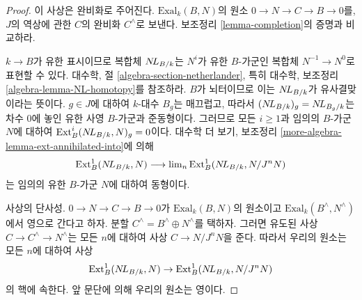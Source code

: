 \begin{proof}
이 사상은 완비화로 주어진다. $\text{Exal}_k(B, N)$의 원소
$0 \to N \to C \to B \to 0$를, $J$의 역상에 관한 $C$의 완비화
$C^\wedge$로 보낸다. 보조정리 \ref{lemma-completion}의 증명과 비교하라.

\medskip\noindent
$k \to B$가 유한 표시이므로 복합체 $\mathop{N\!L}\nolimits_{B/k}$는 $N^i$가 유한
$B$-가군인 복합체 $N^{-1} \to N^0$로 표현할 수 있다. 대수학, 절
\ref{algebra-section-netherlander}, 특히 대수학, 보조정리
\ref{algebra-lemma-NL-homotopy}를 참조하라. $B$가 뇌터이므로 이는
$\mathop{N\!L}\nolimits_{B/k}$가 유사결맞이라는 뜻이다. $g \in J$에 대하여 $k$-대수
$B_g$는 매끄럽고, 따라서 $(\mathop{N\!L}\nolimits_{B/k})_g = \mathop{N\!L}\nolimits_{B_g/k}$는 차수 $0$에
놓인 유한 사영 $B$-가군과 준동형이다.%
그러므로 모든 $i \geq 1$과 임의의 $B$-가군 $N$에 대하여
$\text{Ext}^i_B(\mathop{N\!L}\nolimits_{B/k}, N)_g = 0$이다. 대수학 더 보기, 보조정리
\ref{more-algebra-lemma-ext-annihilated-into}에 의해
$$
\text{Ext}^1_B(\mathop{N\!L}\nolimits_{B/k}, N) \longrightarrow
\mathop{\mathrm{lim}}\nolimits_n \text{Ext}^1_B(\mathop{N\!L}\nolimits_{B/k}, N/J^n N)
$$
는 임의의 유한 $B$-가군 $N$에 대하여 동형이다.

\medskip\noindent
사상의 단사성. $0 \to N \to C \to B \to 0$가
$\text{Exal}_k(B, N)$의 원소이고 $\text{Exal}_k(B^\wedge, N^\wedge)$에서
영으로 간다고 하자. 분할 $C^\wedge = B^\wedge \oplus N^\wedge$를
택하자. 그러면 유도된 사상 $C \to C^\wedge \to N^\wedge$는 모든 $n$에
대하여 사상 $C \to N/J^nN$을 준다. 따라서 우리의 원소는 모든 $n$에
대하여 사상
$$
\text{Ext}^1_B(\mathop{N\!L}\nolimits_{B/k}, N) \to
\text{Ext}^1_B(\mathop{N\!L}\nolimits_{B/k}, N/J^n N)
$$
의 핵에 속한다. 앞 문단에 의해 우리의 원소는 영이다.


\end{proof}
